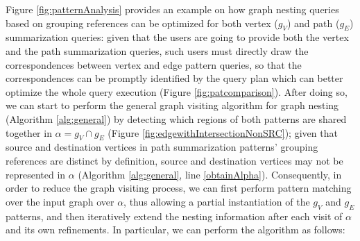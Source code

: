 Figure \ref{fig:patternAnalysis} provides an example on how  graph nesting queries based on grouping references can be optimized for both vertex ($g_V$) and path ($g_E$) summarization queries: given that the users are going to provide both the vertex and the path summarization queries, such users must directly draw the correspondences between vertex and edge pattern queries, so that the correspondences can be promptly  identified by the query plan which can better optimize the whole query execution (Figure \ref{fig:patcomparison}). After doing so, we can start to perform the general graph visiting algorithm for graph nesting (Algorithm \ref{alg:general}) by detecting which regions of both patterns are shared together in $\alpha=g_V\cap g_E$ (Figure \ref{fig:edgewithIntersectionNonSRC}); given that source and destination vertices in path summarization patterns' grouping references are distinct by definition, source and destination vertices may not be represented in $\alpha$ (Algorithm \ref{alg:general}, line \ref{obtainAlpha}). Consequently, in order to reduce the graph visiting process, we can first perform pattern matching over the input graph over $\alpha$, thus allowing a partial instantiation of the $g_V$ and $g_E$ patterns, and then iteratively extend the nesting information after each visit of $\alpha$ and  its own refinements. In particular, we can perform the algorithm  as follows:
